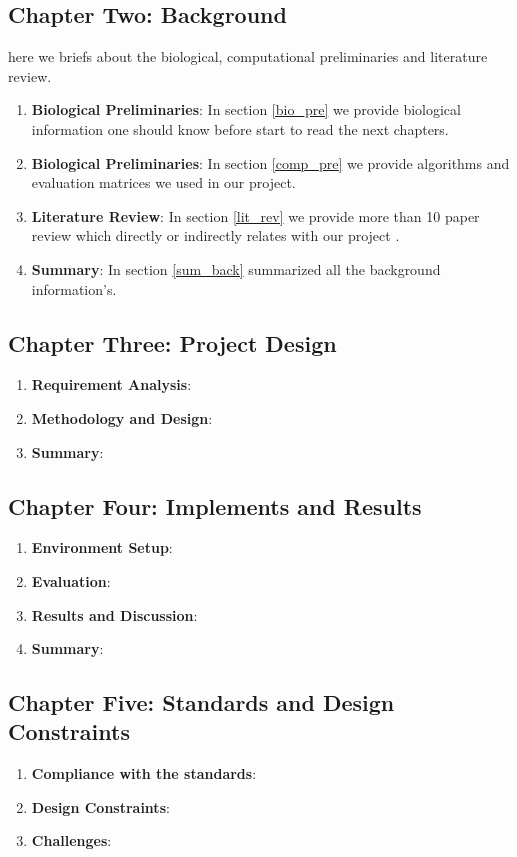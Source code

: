 \subsection{Chapter Two: Background}
here we briefs about the biological, computational preliminaries and literature review.
\begin{enumerate}
  \item \textbf{Biological Preliminaries}: In section \ref{bio_pre} we provide biological information one should know before start to read the next chapters.
  \item \textbf{Biological Preliminaries}: In section \ref{comp_pre} we provide algorithms and evaluation matrices we used in our project.
  \item \textbf{Literature Review}: In section \ref{lit_rev} we provide more than 10 paper review which directly or indirectly relates with our project .
  \item \textbf{Summary}: In section \ref{sum_back} summarized all the background information's.
\end{enumerate}

\subsection{Chapter Three: Project Design}
\begin{enumerate}
  \item \textbf{Requirement Analysis}: 
  \item \textbf{Methodology and Design}:
  \item \textbf{Summary}: 
\end{enumerate}

\subsection{Chapter Four: Implements and Results}
\begin{enumerate}
  \item \textbf{Environment Setup}: 
  \item \textbf{Evaluation}:
  \item \textbf{Results and Discussion}:
  \item \textbf{Summary}: 
\end{enumerate}

\subsection{Chapter Five: Standards and Design Constraints}
\begin{enumerate}
  \item \textbf{Compliance with the standards}: 
  \item \textbf{Design Constraints}:
  \item \textbf{Challenges}:
\end{enumerate}